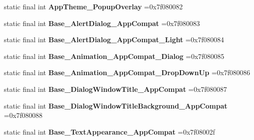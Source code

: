 \begin{DoxyCompactItemize}
\item 
\hypertarget{classcheck_1_1test_1_1_r_1_1style_a06680ffe0a9ae57dd829f2c21eb24d7b}{}static final int {\bfseries App\+Theme\+\_\+\+Popup\+Overlay} =0x7f080082\label{classcheck_1_1test_1_1_r_1_1style_a06680ffe0a9ae57dd829f2c21eb24d7b}

\item 
\hypertarget{classcheck_1_1test_1_1_r_1_1style_aa81193c01e5080dcb553d01204a60daa}{}static final int {\bfseries Base\+\_\+\+Alert\+Dialog\+\_\+\+App\+Compat} =0x7f080083\label{classcheck_1_1test_1_1_r_1_1style_aa81193c01e5080dcb553d01204a60daa}

\item 
\hypertarget{classcheck_1_1test_1_1_r_1_1style_a71dd674f9c2679826553436190fceda8}{}static final int {\bfseries Base\+\_\+\+Alert\+Dialog\+\_\+\+App\+Compat\+\_\+\+Light} =0x7f080084\label{classcheck_1_1test_1_1_r_1_1style_a71dd674f9c2679826553436190fceda8}

\item 
\hypertarget{classcheck_1_1test_1_1_r_1_1style_ab20cea645087cb76e4f14e8d63b90265}{}static final int {\bfseries Base\+\_\+\+Animation\+\_\+\+App\+Compat\+\_\+\+Dialog} =0x7f080085\label{classcheck_1_1test_1_1_r_1_1style_ab20cea645087cb76e4f14e8d63b90265}

\item 
\hypertarget{classcheck_1_1test_1_1_r_1_1style_a534b652601a8e7c5ae3820bb44b87d5b}{}static final int {\bfseries Base\+\_\+\+Animation\+\_\+\+App\+Compat\+\_\+\+Drop\+Down\+Up} =0x7f080086\label{classcheck_1_1test_1_1_r_1_1style_a534b652601a8e7c5ae3820bb44b87d5b}

\item 
\hypertarget{classcheck_1_1test_1_1_r_1_1style_abcc1725cc5d2e50949915e3718120144}{}static final int {\bfseries Base\+\_\+\+Dialog\+Window\+Title\+\_\+\+App\+Compat} =0x7f080087\label{classcheck_1_1test_1_1_r_1_1style_abcc1725cc5d2e50949915e3718120144}

\item 
\hypertarget{classcheck_1_1test_1_1_r_1_1style_a35e0b1aed0b6b0f5352c1762be5b6868}{}static final int {\bfseries Base\+\_\+\+Dialog\+Window\+Title\+Background\+\_\+\+App\+Compat} =0x7f080088\label{classcheck_1_1test_1_1_r_1_1style_a35e0b1aed0b6b0f5352c1762be5b6868}

\item 
\hypertarget{classcheck_1_1test_1_1_r_1_1style_abeba811c0b41be4c85a30df7832ff3d3}{}static final int {\bfseries Base\+\_\+\+Text\+Appearance\+\_\+\+App\+Compat} =0x7f08002f\label{classcheck_1_1test_1_1_r_1_1style_abeba811c0b41be4c85a30df7832ff3d3}


\end{DoxyCompactItemize}
